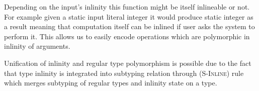 Depending on the input's inlinity this function might be itself inlineable or not. For example
given a static input literal integer it would produce static integer as a result meaning that 
computation itself can be inlined if user asks the system to perform it. This allows
us to easily encode operations which are polymorphic in inlinity of arguments.

Unification of inlinity and regular type polymorphism is possible due to the fact that type
inlinity is integrated into subtyping relation through (\textsc{S-Inline}) rule which merges
subtyping of regular types and inlinity state on a type.

\clearpage

